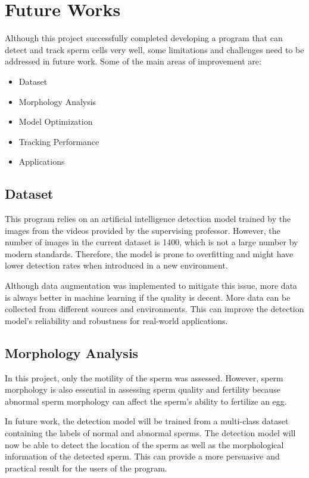 \chapter{Future Works}
Although this project successfully completed developing a program that can detect and track sperm cells very well, some limitations and challenges need to be addressed in future work. Some of the main areas of improvement are:

\begin{itemize}
    \item Dataset
    \item Morphology Analysis
    \item Model Optimization
    \item Tracking Performance
    \item Applications
\end{itemize}

\newpage
\section{Dataset}
This program relies on an artificial intelligence detection model trained by the images from the videos provided by the supervising professor. However, the number of images in the current dataset is 1400, which is not a large number by modern standards. Therefore, the model is prone to overfitting and might have lower detection rates when introduced in a new environment. 

Although data augmentation was implemented to mitigate this issue, more data is always better in machine learning if the quality is decent. More data can be collected from different sources and environments. This can improve the detection model's reliability and robustness for real-world applications.

\section{Morphology Analysis}
In this project, only the motility of the sperm was assessed. However, sperm morphology is also essential in assessing sperm quality and fertility because abnormal sperm morphology can affect the sperm's ability to fertilize an egg.

In future work, the detection model will be trained from a multi-class dataset containing the labels of normal and abnormal sperms. The detection model will now be able to detect the location of the sperm as well as the morphological information of the detected sperm. This can provide a more persuasive and practical result for the users of the program.

